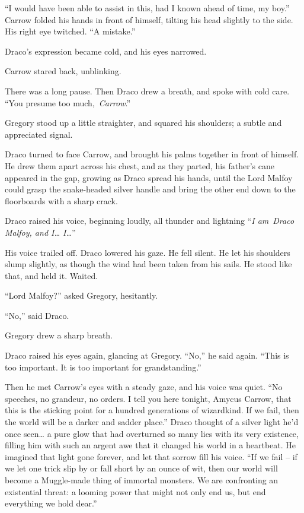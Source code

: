 ``I would have been able to assist in this, had I known ahead of time,
my boy.'' Carrow folded his hands in front of himself, tilting his head
slightly to the side. His right eye twitched. ``A mistake.''

Draco's expression became cold, and his eyes narrowed.

Carrow stared back, unblinking.

There was a long pause. Then Draco drew a breath, and spoke with cold
care. ``You presume too much,~\emph{Carrow}.''

Gregory stood up a little straighter, and squared his shoulders; a
subtle and appreciated signal.

Draco turned to face Carrow, and brought his palms together in front of
himself. He drew them apart across his chest, and as they parted, his
father's cane appeared in the gap, growing as Draco spread his hands,
until the Lord Malfoy could grasp the snake-headed silver handle and
bring the other end down to the floorboards with a sharp crack.

Draco raised his voice, beginning loudly, all thunder and lightning
``\emph{I am}~\emph{Draco Malfoy, and I\ldots{} I\ldots{}}''

His voice trailed off. Draco lowered his gaze. He fell silent. He let
his shoulders slump slightly, as though the wind had been taken from his
sails. He stood like that, and held it. Waited.

``Lord Malfoy?'' asked Gregory, hesitantly.

``No,'' said Draco.

Gregory drew a sharp breath.

Draco raised his eyes again, glancing at Gregory. ``No,'' he said again.
``This is too important. It is too important for grandstanding.''

Then he met Carrow's eyes with a steady gaze, and his voice was quiet.
``No speeches, no grandeur, no orders. I tell you here tonight, Amycus
Carrow, that this is the sticking point for a hundred generations of
wizardkind. If we fail, then the world will be a darker and sadder
place.'' Draco thought of a silver light he'd once seen\ldots{} a pure
glow that had overturned so many lies with its very existence, filling
him with such an argent awe that it changed his world in a heartbeat. He
imagined that light gone forever, and let that sorrow fill his voice.
``If we fail -- if we let one trick slip by or fall short by an ounce of
wit, then our world will become a Muggle-made thing of immortal
monsters. We are confronting an existential threat: a looming power that
might not only end us, but end everything we hold dear.''

